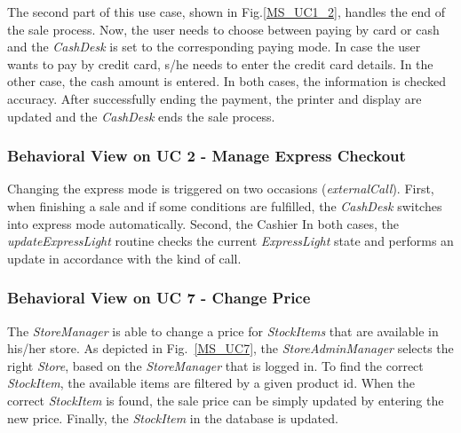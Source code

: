 		The second part of this use case, shown in Fig.\added{~}\ref{MS_UC1_2}, handles the end of the sale process. 
		Now, the user needs to choose between paying by card or cash and the \textit{CashDesk} is set to the corresponding paying mode. 
		In case the user wants to pay by credit card, s/he needs to enter the credit card details. 
		In the other case, the cash amount is entered. 
		In both cases, the information is checked  accuracy.
		After successfully ending the payment, the printer and display are updated and the \textit{CashDesk} ends the sale process.

		\subsubsection*{Behavioral View on UC 2 - Manage Express Checkout}
		Changing the express mode is triggered on two occasions (\textit{externalCall}). 
		First, when finishing a sale and if some conditions are fulfilled, the \textit{CashDesk} switches into express mode automatically. 
		Second, the Cashier 
		In both cases, the \textit{updateExpressLight} routine checks the current \textit{ExpressLight} state and performs an update in accordance with the kind of call.
		
		\subsubsection*{Behavioral View on UC 7 - Change Price}
		The \textit{StoreManager} is able to change a price for \textit{StockItems} that are available in his/her store. 
		As depicted in Fig.~\ref{MS_UC7}, the \textit{StoreAdminManager} selects the right \textit{Store}, based on the \textit{StoreManager} that is logged in. 
		To find the correct \textit{StockItem}, the available items are filtered by a given product id. 
		When the correct \textit{StockItem} is found, the sale price can be simply updated by entering the new price. 
		Finally, the \textit{StockItem} in the database is updated.
		
